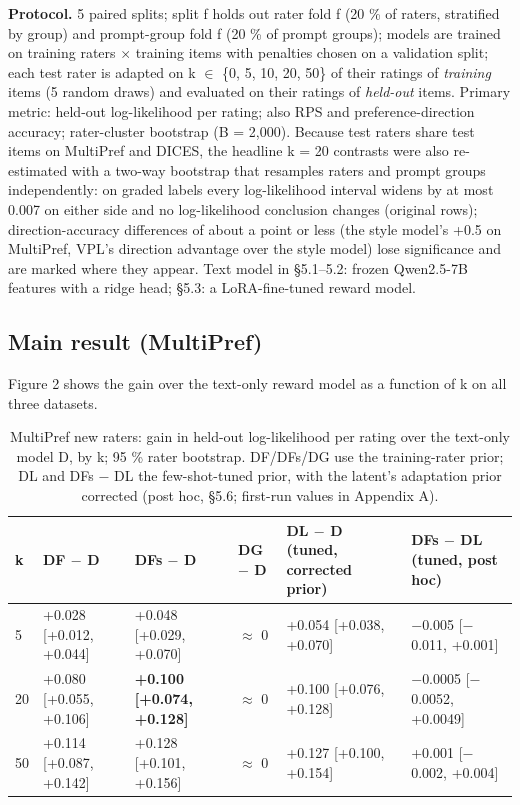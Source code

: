 \documentclass{article}
\begin{document}
\textbf{Protocol.} 5 paired splits; split f holds out rater fold f (20 \% of raters, stratified by group) and prompt-group fold f (20 \% of prompt groups); models are trained on training raters $\times$ training items with penalties chosen on a validation split; each test rater is adapted on k $\in$ \{0, 5, 10, 20, 50\} of their ratings of \emph{training} items (5 random draws) and evaluated on their ratings of \emph{held-out} items. Primary metric: held-out log-likelihood per rating; also RPS and preference-direction accuracy; rater-cluster bootstrap (B = 2,000). Because test raters share test items on MultiPref and DICES, the headline k = 20 contrasts were also re-estimated with a two-way bootstrap that resamples raters and prompt groups independently: on graded labels every log-likelihood interval widens by at most 0.007 on either side and no log-likelihood conclusion changes (original rows); direction-accuracy differences of about a point or less (the style model's +0.5 on MultiPref, VPL's direction advantage over the style model) lose significance and are marked where they appear. Text model in \S{}5.1--5.2: frozen Qwen2.5-7B features with a ridge head; \S{}5.3: a LoRA-fine-tuned reward model.

\subsection{Main result (MultiPref)}

Figure 2 shows the gain over the text-only reward model as a function of k on all three datasets.

\begin{table}[t]\centering\caption{MultiPref new raters: gain in held-out log-likelihood per rating over the text-only model D, by k; 95 \% rater bootstrap. DF/DFs/DG use the training-rater prior; DL and DFs $-$ DL the few-shot-tuned prior, with the latent's adaptation prior corrected (post hoc, \S{}5.6; first-run values in Appendix A).}\scriptsize\setlength{\tabcolsep}{3pt}\begin{tabular}{@{}
  l
  l
  l
  l
  l
  l@{}}
\toprule\noalign{}
k & DF $-$ D & DFs $-$ D & DG $-$ D & DL $-$ D (tuned, corrected prior) & DFs $-$ DL (tuned, post hoc) \\
\midrule\noalign{}



5 & +0.028 {[}+0.012, +0.044{]} & +0.048 {[}+0.029, +0.070{]} & $\approx$ 0 & +0.054 {[}+0.038, +0.070{]} & $-$0.005 {[}$-$0.011, +0.001{]} \\
20 & +0.080 {[}+0.055, +0.106{]} & \textbf{+0.100 {[}+0.074, +0.128{]}} & $\approx$ 0 & +0.100 {[}+0.076, +0.128{]} & $-$0.0005 {[}$-$0.0052, +0.0049{]} \\
50 & +0.114 {[}+0.087, +0.142{]} & +0.128 {[}+0.101, +0.156{]} & $\approx$ 0 & +0.127 {[}+0.100, +0.154{]} & +0.001 {[}$-$0.002, +0.004{]} \\
\bottomrule
\end{tabular}\end{table}
\end{document}
